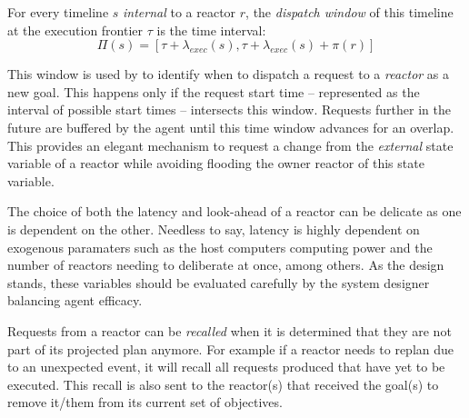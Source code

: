 \begin{definition}
  \label{def:dispatch}
  For every timeline $s$ {\em internal} to a reactor $r$, the {\em
    dispatch window} of this timeline at the execution frontier $\tau$
  is the time interval:
  \begin{equation*}
    \Pi(s) = [\tau + \lambda_{exec}(s), \tau+\lambda_{exec}(s)+\pi(r)]
  \end{equation*}
\end{definition}

This window is used by \rx to identify when to dispatch a request to a
{\em reactor} as a new goal. This happens only if the request start
time -- represented as the interval of possible start times --
intersects this window. Requests further in the future are buffered by
the agent until this time window advances for an overlap. This
provides an elegant mechanism to request a change from the {\em
  external} state variable of a reactor while avoiding flooding the
owner reactor of this state variable. 

The choice of both the latency and look-ahead of a reactor can be
delicate as one is dependent on the other. Needless to say, latency is
highly dependent on exogenous paramaters such as the host computers
computing power and the number of reactors needing to deliberate at
once, among others. As the design stands, these variables should be
evaluated carefully by the system designer balancing agent efficacy.


Requests from a reactor can be {\em recalled} when it is determined
that they are not part of its projected plan anymore. For example if a
reactor needs to replan due to an unexpected event, it will recall all
requests produced that have yet to be executed.  This recall is also
sent to the reactor(s) that received the goal(s) to remove it/them
from its current set of objectives.


